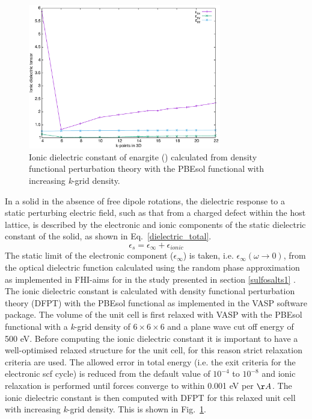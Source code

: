 \documentclass[11pt, twoside]{report}
\begin{document}
\begin{figure}[h!]
    \centering
    \includegraphics[width=0.75\textwidth]{figures/enargite_ionic_dielectric.pdf}
    \caption{Ionic dielectric constant of enargite ({\enargite}) calculated from density functional perturbation theory with the PBEsol functional with increasing \textit{k}-grid density.}
    \label{enargite_ionic_dielectric}
\end{figure}

In a solid in the absence of free dipole rotations, the dielectric response to a static perturbing electric field, such as that from a charged defect within the host lattice, is described by the electronic and ionic components of the static dielectric constant of the solid, as shown in Eq.~\ref{dielectric_total}. 
\begin{equation} \label{dielectric_total}
\epsilon_s = \epsilon_{\infty} + \epsilon_{ionic}
\end{equation}
The static limit of the electronic component ($\epsilon_{\infty}$) is taken, i.e.  $\epsilon_{\infty}(\omega \rightarrow 0)$, from the optical dielectric function calculated using the random phase approximation as implemented in FHI-aims for {\enargite} in the study presented in section \ref{sulfosalts1} \cite{sulfosalts_paper}.
The ionic dielectric constant is calculated with density functional perturbation theory (DFPT) with the PBEsol functional as implemented in the VASP \cite{VASP} software package. The volume of the unit cell is first relaxed with VASP with the PBEsol functional with a \textit{k}-grid density of $6\times6\times6$ and a plane wave cut off energy of 500 eV. Before computing the ionic dielectric constant it is important to have a well-optimised relaxed structure for the unit cell, for this reason strict relaxation criteria are used. The allowed error in total energy (i.e. the exit criteria for the electronic scf cycle) is reduced from the default value of $10^{-4}$ to $10^{-8}$ and ionic relaxation is performed until forces converge to within 0.001 eV per $\AA$. The ionic dielectric constant is then computed with DFPT for this relaxed unit cell with increasing \textit{k}-grid density. This is shown in Fig.~\ref{enargite_ionic_dielectric}.
\end{document}
